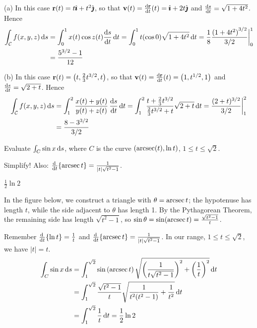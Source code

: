 \begin{solution}
(a) 
In this case $\mathbf{r}(t)=t\hat{\pmb{\imath}}+t^2\hat{\pmb{\jmath}}$, so that
$\vv(t)=\diff{\vr}{t}(t)=\hi+2t\hj$ and $\diff{s}{t}=\sqrt{1+4t^2} $. Hence
\begin{align*}
\int_\cC f(x,y,z)\,\dee{s}
&=\int_0^1 x(t)\cos z(t) \diff{s}{t}\,\dee{t}
=\int_0^1 t(\cos 0) \sqrt{1+4t^2}\,\dee{t}
=\frac{1}{8}\frac{ {(1+4t^2)}^{3/2}}{3/2}\bigg|_0^1\\
&=\frac{5^{3/2}-1}{12}
\end{align*}

(b) In this case $\mathbf{r}(t)=\big(t,\frac{2}{3}t^{3/2},t\big)$, so
that
$\vv(t)=\diff{\vr}{t}(t)=\big(1,t^{1/2},1\big)$ and 
$\diff{s}{t}=\sqrt{2+t} $. Hence
\begin{align*}
\int_\cC f(x,y,z)\,\dee{s}
&=\int_1^2 \frac{x(t)+y(t)}{y(t)+z(t)} \, \diff{s}{t}\,\dee{t}
=\int_1^2 \frac{t+{2\over 3}t^{3/2}}{{2\over3}t^{3/2}+t} \sqrt{2+t}\,\dee{t}
=\frac{(2+t)^{3/2}}{3/2}\bigg|_1^2 \\
&=\frac{8-3^{3/2}}{3/2}
\end{align*}	

\end{solution}



\begin{question}
	Evaluate $\int_C \sin x\,\mathrm{d}s$, where $C$ is the curve $(\mathop{\mathrm{arcsec}}(t), \ln t)$, $1 \le t \le \sqrt{2}$. 
\end{question}
\begin{hint}
	Simplify! Also: $\diff{}{t}\{\arcsec t\} = \frac{1}{|t|\sqrt{t^2-1}}$.
\end{hint}
\begin{answer}
	$\frac12 \ln 2$
\end{answer}
\begin{solution}
  In the figure below, we construct a triangle with $\theta=\mathop{\mathrm{arcsec}} t$; the hypotenuse has length $t$, while the side adjacent to $\theta$ has length 1. By the Pythagorean Theorem, the remaining side has length $\sqrt{t^2-1}$, so $\sin\theta=\sin(\mathop{\mathrm{arcsec}} t)=\frac{\sqrt{t^2-1}}{t}$.
               \begin{center}
\end{center}
Remember $\diff{}{t}\{\ln t\} = \frac{1}{t}$ and $\diff{}{t}\{\arcsec t\} = \frac{1}{|t|\sqrt{t^2-1}}$. In our range, $1 \le t \le \sqrt 2$, we have $|t|=t$.
	\begin{align*}
		\int_C \sin x \,\mathrm{d}s&=\int_{1}^{\sqrt 2}\sin\left(\mathop{\mathrm{arcsec}} t \right)\sqrt{\left(\frac{1}{t\sqrt{t^2-1}} \right)^2+\left(\frac1t \right)^2}\,\mathrm{d}t\\
		&=\int_1^{\sqrt{2}} \frac{\sqrt{t^2-1}}{t}\sqrt{\frac{1}{t^2(t^2-1)}+\frac{1}{t^2}} \,\mathrm{d}t\\
		&=\int_1^{\sqrt 2}\frac1t\,\mathrm{d}t=\frac{1}{2}\ln 2
	\end{align*}
\end{solution}



